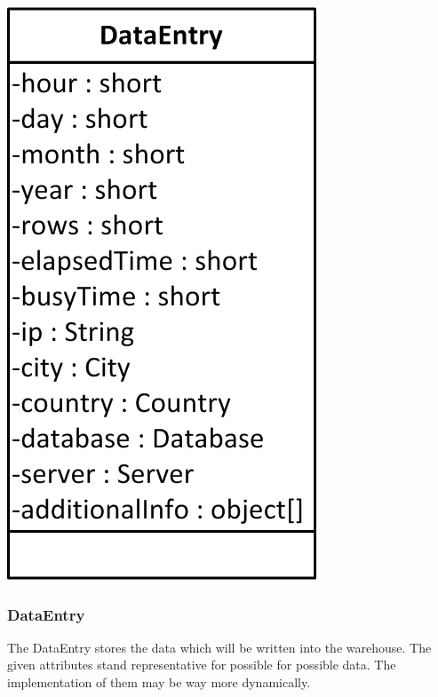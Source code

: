 \begin{center}
\includegraphics{Pictures/Parts/DataEntry.png}
\end{center}  

\subsubsection*{DataEntry}
The DataEntry stores the data which will be written into the warehouse. The given attributes stand representative
for possible for possible data. The implementation of them may be way more dynamically.


